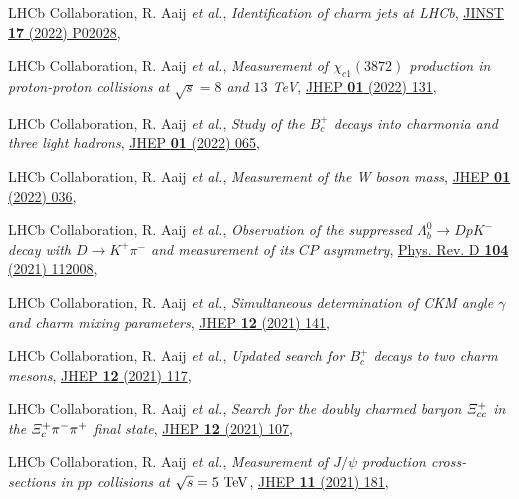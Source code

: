 \begin{cvcontent}
\begin{enumerate}[label={[\arabic*]}, leftmargin=1.5cm]
    \item LHCb Collaboration, R. Aaij \emph{et al.}, 
    \emph{Identification of charm jets at LHCb},
    \href{https://doi.org/10.1088/1748-0221/17/02/p02028}{JINST \textbf{17} (2022) P02028},
    \item LHCb Collaboration, R. Aaij \emph{et al.}, 
    \emph{Measurement of $\chi_{c1}(3872)$ production in proton-proton collisions at $\sqrt{s}=8$ and $13$ TeV},
    \href{https://doi.org/10.1007/JHEP01(2022)131}{JHEP \textbf{01} (2022) 131},
    \item LHCb Collaboration, R. Aaij \emph{et al.}, 
    \emph{Study of the $B_c^+$ decays into charmonia and three light hadrons},
    \href{https://doi.org/10.1007/JHEP01(2022)065}{JHEP \textbf{01} (2022) 065},
    \item LHCb Collaboration, R. Aaij \emph{et al.}, 
    \emph{Measurement of the W boson mass}, 
    \href{https://doi.org/10.1007/JHEP01(2022)036}{JHEP \textbf{01} (2022) 036},
    \item LHCb Collaboration, R. Aaij \emph{et al.}, 
    \emph{Observation of the suppressed $\Lambda_b^0\to D p K^-$ decay with $D\to K^+ \pi^-$ and measurement of its $C\!P$ asymmetry}, 
    \href{https://link.aps.org/doi/10.1103/PhysRevD.104.112008}{Phys. Rev. D \textbf{104} (2021) 112008},
    \item LHCb Collaboration, R. Aaij \emph{et al.}, 
    \emph{Simultaneous determination of CKM angle $\gamma$ and charm mixing parameters},
    \href{https://doi.org/10.1007/JHEP12(2021)141}{JHEP \textbf{12} (2021) 141},
    \sloppy
    \item LHCb Collaboration, R. Aaij \emph{et al.}, 
    \emph{Updated search for $B_c^+$ decays to two charm mesons},
    \href{https://doi.org/10.1007/JHEP12(2021)117}{JHEP \textbf{12} (2021) 117},
    \item LHCb Collaboration, R. Aaij \emph{et al.}, 
    \emph{Search for the doubly charmed baryon $\it{\Xi}_{cc}^{+}$ in the $\it{\Xi}_{c}^{+} \pi^{-} \pi^{+}$ final state},
    \href{https://doi.org/10.1007/JHEP12(2021)107}{JHEP \textbf{12} (2021) 107},
    \item LHCb Collaboration, R. Aaij \emph{et al.}, 
    \emph{Measurement of $J/\psi$ production cross-sections in $pp$ collisions at $\sqrt{s}=5~\rm{TeV}$},
    \href{http://dx.doi.org/10.1007/JHEP11(2021)181}{JHEP \textbf{11} (2021) 181},

\end{enumerate}
\end{cvcontent}
